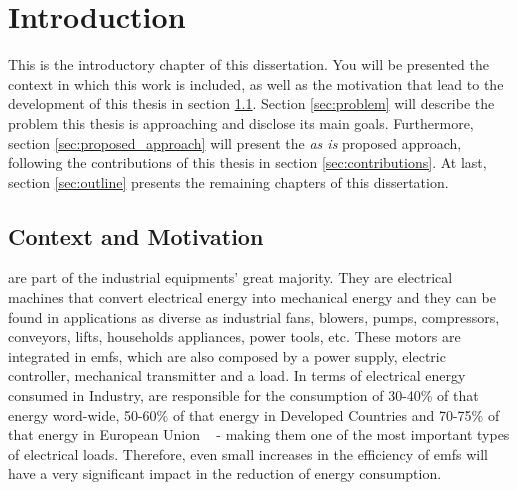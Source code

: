 \newcommand{\unlthesis}{\emph{unlthesis}}
\newcommand{\unlthesisclass}{\texttt{unlthesis.cls}}

\chapter{Introduction}  
\label{cha:introduction} 

This is the introductory chapter of this dissertation. You will be presented the context in which this work is included, as well as the motivation that lead to the development of this thesis in section \ref{sec:motivation}. Section \ref{sec:problem} will describe the problem this thesis is approaching and disclose its main goals. Furthermore, section \ref{sec:proposed_approach} will present the \emph{as is} proposed approach, following the contributions of this thesis in section \ref{sec:contributions}. At last, section \ref{sec:outline} presents the remaining chapters of this dissertation.

\section{Context and Motivation} %
\label{sec:motivation}

 are part of the industrial equipments' great majority. They are electrical machines that convert electrical energy into mechanical energy and they can be found in applications as diverse as industrial fans, blowers, pumps, compressors, conveyors, lifts, households appliances, power tools, etc. 
These motors are integrated in \acrfull{emfs}, which are also composed by a power supply, electric controller, mechanical transmitter and a load. 
In terms of electrical energy consumed in Industry,  are responsible for the consumption of 30-40\% of that energy word-wide, 50-60\% of that energy in Developed Countries and 70-75\% of that energy in European Union ~\cite{Ferreira1} - making them one of the most important types of electrical loads. 
Therefore, even small increases in the efficiency of \acrshort{emfs} will have a very significant impact in the reduction of energy consumption.


